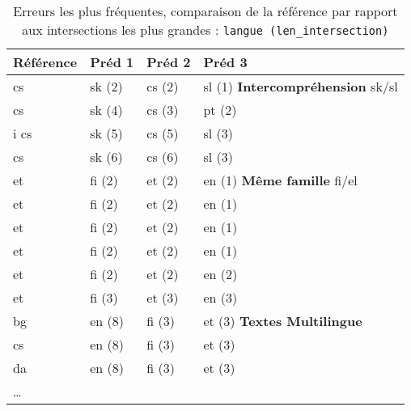 \begin{table}
\begin{tabular}{l|lll}
Référence&Préd 1 & Préd 2 & Préd 3\\
\hline
cs	&sk (2)	&cs (2)	&sl (1) \textbf{Intercompréhension} sk/sl\\
cs	&sk (4)	&cs (3)	&pt (2)\\
i%
cs	&sk (5)	&cs (5)	&sl (3)\\
cs	&sk (6)	&cs (6)	&sl (3)\\
\hline
et	&fi (2)	&et (2)	&en (1) \textbf{Même famille} fi/el\\
et	&fi (2)	&et (2)	&en (1)\\
et	&fi (2)	&et (2)	&en (1)\\
et	&fi (2)	&et (2)	&en (1)\\
et	&fi (2)	&et (2)	&en (2)\\
et	&fi (3)	&et (3)	&en (3)\\
\hline
bg	&en (8)	&fi (3)	&et (3) \textbf{Textes Multilingue}\\
cs	&en (8)	&fi (3)	&et (3)\\
da	&en (8)	&fi (3)	&et (3)\\
\dots & & & \\
\hline
\end{tabular}
\caption{Erreurs les plus fréquentes, comparaison de la référence par rapport aux intersections les plus grandes : \texttt{langue (len\_intersection)}}
\end{table}
